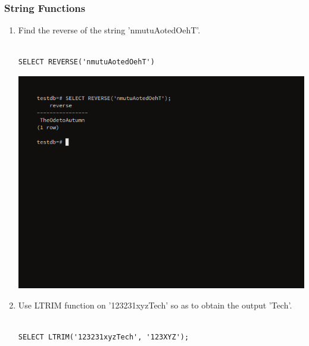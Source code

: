 \subsubsection{String Functions}

\begin{enumerate}
\item Find the reverse of the string 'nmutuAotedOehT'.\newline
\begin{verbatim}

SELECT REVERSE('nmutuAotedOehT')

\end{verbatim}
\newline
\includegraphics[width=\linewidth]{../Images/Strings/14.png}
\item Use LTRIM function on '123231xyzTech' so as to obtain the output 'Tech'.\newline
\begin{verbatim}

SELECT LTRIM('123231xyzTech', '123XYZ');


\end{verbatim}
\end{enumerate}
